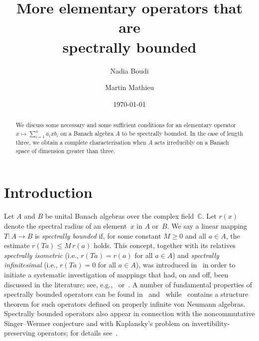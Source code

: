 \documentclass[a4paper,12pt,reqno]{amsart}
\numberwithin{equation}{section}
\theoremstyle{definition}
\begin{document}
\title[More elementary operators that are spectrally bounded]{More elementary operators that are\\ spectrally bounded}
\author{Nadia Boudi}
\address{D\' epartement de Math\' ematiques, Universit\' e Moulay Ismail, Facult\'{e} des Sciences, Mekn\`es, Maroc}
\author{Martin Mathieu}
\address{Pure Mathematics Research Centre, Queen's University Belfast, University Road, Bel\-fast BT7 1NN, Northern Ireland}

\begin{abstract}
We discuss some necessary and some sufficient conditions for an elementary operator
$x\mapsto\sum_{i=1}^n a_ixb_i$ on a Banach algebra $A$ to be spectrally bounded.
In the case of length three, we obtain a complete characterisation when $A$
acts irreducibly on a Banach space of dimension greater than three.
\end{abstract}

\date{\today}

\maketitle

\section{Introduction}\label{sect:intro}

\noindent
Let $A$ and $B$ be unital Banach algebras over the complex field~${\mathbb{C}}$. Let $r(x)$ denote the spectral radius of
an element~$x$ in $A$ or~$B$. We say a linear mapping \hbox{$T\colon A\to B$} is \textit{spectrally bounded\/} if,
for some constant $M\geq0$ and all $a\in A$, the estimate $r(Ta)\leq M\,r(a)$ holds.
This concept, together with its relatives \textit{spectrally isometric\/} (i.e., $r(Ta)=r(a)$ for all $a\in A$) and
\textit{spectrally infinitesimal\/} (i.e., $r(Ta)=0$ for all $a\in A$), was introduced in~\cite{Mat1} in order to initiate a systematic
investigation of mappings that had, on and off, been discussed in the literature; see, e.g.,~\cite{Aup} or~\cite{Pta}.
A number of fundamental properties of spectrally bounded operators can be found in~\cite{MaSc} and~\cite{MaSo}
while~\cite{MaSc2} contains a structure theorem for such operators defined on properly infinite von Neumann algebras.
Spectrally bounded operators also appear in connection with the noncommutative Singer--Wermer conjecture and with
Kaplansky's problem on invertibility-preserving operators; for details see~\cite{Mat2}.
\end{document}
